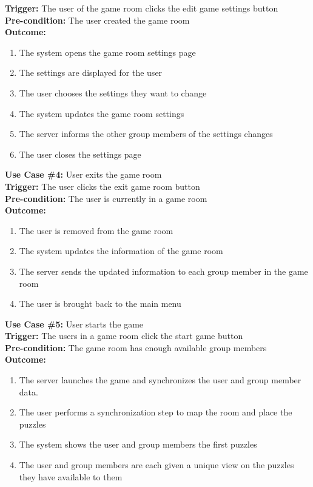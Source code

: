 \documentclass[12pt]{article}
\begin{document}
\textbf{Trigger:} The user of the game room clicks the edit game settings button\\
\textbf{Pre-condition:} The user created the game room\\
\textbf{Outcome:}
\begin{enumerate}
	\item The system opens the game room settings page
    \item The settings are displayed for the user
    \item The user chooses the settings they want to change
    \item The system updates the game room settings
    \item The server informs the other group members of the settings changes
    \item The user closes the settings page
\end{enumerate}
\textbf{Use Case \#4:} User exits the game room\\
\textbf{Trigger:} The user clicks the exit game room button\\
\textbf{Pre-condition:} The user is currently in a game room\\
\textbf{Outcome:}
\begin{enumerate}
	\item The user is removed from the game room
    \item The system updates the information of the game room
    \item The server sends the updated information to each group member in the game room
    \item The user is brought back to the main menu
\end{enumerate}
\textbf{Use Case \#5:} User starts the game\\
\textbf{Trigger:} The users in a game room click the start game button\\
\textbf{Pre-condition:} The game room has enough available group members\\
\textbf{Outcome:}
\begin{enumerate}
	\item The server launches the game and synchronizes the user and group member data. 
    \item The user performs a synchronization step to map the room and place the puzzles
    \item The system shows the user and group members the first puzzles
    \item The user and group members are each given a unique view on the puzzles they have available to them
\end{enumerate}
\end{document}
